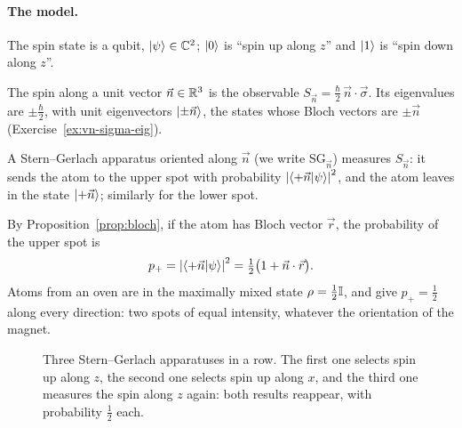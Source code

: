 \paragraph{The model.}
\begin{steps}
  \item The spin state is a qubit, $\left|\psi\right\rangle\in\mathbb{C}^2$; $\left|0\right\rangle$ is ``spin up along $z$'' and $\left|1\right\rangle$ is ``spin down along $z$''.
  \item The spin along a unit vector $\vec n\in\mathbb{R}^3$ is the observable $S_{\vec n}=\tfrac\hbar2\,\vec n\cdot\vec\sigma$. Its eigenvalues are $\pm\tfrac\hbar2$, with unit eigenvectors $\left|\pm\vec n\right\rangle$, the states whose Bloch vectors are $\pm\vec n$ (Exercise~\ref{ex:vn-sigma-eig}).
  \item A Stern--Gerlach apparatus oriented along $\vec n$ (we write SG$_{\vec n}$) measures $S_{\vec n}$: it sends the atom to the upper spot with probability $\left|\left\langle+\vec n\middle|\psi\right\rangle\right|^2$, and the atom leaves in the state $\left|+\vec n\right\rangle$; similarly for the lower spot.
\end{steps}
By Proposition~\ref{prop:bloch}, if the atom has Bloch vector $\vec r$, the probability of the upper spot is
\begin{equation}\label{eq:sg-prob}
  p_+=\left|\left\langle+\vec n\middle|\psi\right\rangle\right|^2=\tfrac12\bigl(1+\vec n\cdot\vec r\bigr).
\end{equation}
Atoms from an oven are in the maximally mixed state $\rho=\tfrac12\mathbb{I}$, and give $p_+=\tfrac12$ along every direction: two spots of equal intensity, whatever the orientation of the magnet.

\begin{figure}[htb]
  \centering
  \caption{Three Stern--Gerlach apparatuses in a row. The first one selects spin up along $z$, the second one selects spin up along $x$, and the third one measures the spin along $z$ again: both results reappear, with probability $\tfrac12$ each.}
  \label{fig:sg}
\end{figure}

